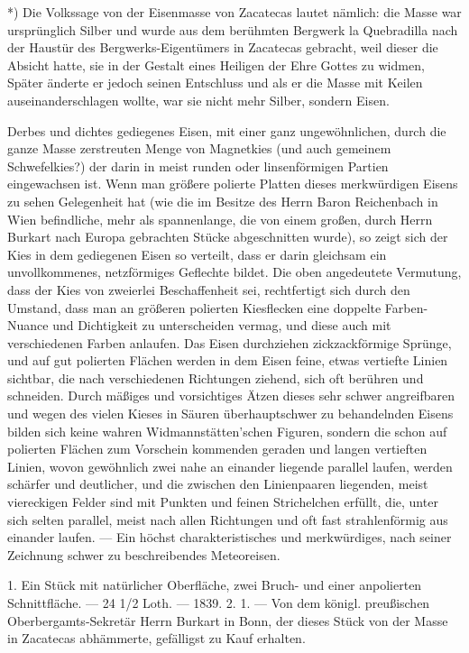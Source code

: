 \documentclass[a4paper, 11pt, oneside, polutonikogreek, german]{article}
\begin{document}
*) Die Volkssage von der Eisenmasse von Zacatecas lautet nämlich: die Masse war ursprünglich Silber und wurde aus dem berühmten Bergwerk la Quebradilla nach der Haustür des Bergwerks-Eigentümers in Zacatecas gebracht, weil dieser die Absicht hatte, sie in der Gestalt eines Heiligen der Ehre Gottes zu widmen, Später änderte er jedoch seinen Entschluss und als er die Masse mit Keilen auseinanderschlagen wollte, war sie nicht mehr Silber, sondern Eisen.

Derbes und dichtes gediegenes Eisen, mit einer ganz ungewöhnlichen, durch die ganze Masse zerstreuten Menge von Magnetkies (und auch gemeinem Schwefelkies?) der darin in meist runden oder linsenförmigen Partien eingewachsen ist. Wenn man größere polierte Platten dieses merkwürdigen Eisens zu sehen Gelegenheit hat (wie die im Besitze des Herrn Baron Reichenbach in Wien befindliche, mehr als spannenlange, die von einem großen, durch Herrn Burkart nach Europa gebrachten Stücke abgeschnitten wurde), so zeigt sich der Kies in dem gediegenen Eisen so verteilt, dass er darin gleichsam ein unvollkommenes, netzförmiges Geflechte bildet. Die oben angedeutete Vermutung, dass der Kies von zweierlei Beschaffenheit sei, rechtfertigt sich durch den Umstand, dass man an größeren polierten Kiesflecken eine doppelte Farben-Nuance und Dichtigkeit zu unterscheiden vermag, und diese auch mit verschiedenen Farben anlaufen. Das Eisen durchziehen zickzackförmige Sprünge, und auf gut polierten Flächen werden in dem Eisen feine, etwas vertiefte Linien sichtbar, die nach verschiedenen Richtungen ziehend, sich oft berühren und schneiden. Durch mäßiges und vorsichtiges Ätzen dieses sehr schwer angreifbaren und wegen des vielen Kieses in Säuren überhauptschwer zu behandelnden Eisens bilden sich keine wahren Widmannstätten'schen Figuren, sondern die schon auf polierten Flächen zum Vorschein kommenden geraden und langen vertieften Linien, wovon gewöhnlich zwei nahe an einander liegende parallel laufen, werden schärfer und deutlicher, und die zwischen den Linienpaaren liegenden, meist viereckigen Felder sind mit Punkten und feinen Strichelchen erfüllt, die, unter sich selten parallel, meist nach allen Richtungen und oft fast strahlenförmig aus einander laufen. — Ein höchst charakteristisches und merkwürdiges, nach seiner Zeichnung schwer zu beschreibendes Meteoreisen.

1. Ein Stück mit natürlicher Oberfläche, zwei Bruch- und einer anpolierten Schnittfläche. — 24 1/2 Loth. — 1839. 2. 1. — Von dem königl. preußischen Oberbergamts-Sekretär Herrn Burkart in Bonn, der dieses Stück von der Masse in Zacatecas abhämmerte, gefälligst zu Kauf erhalten.
\end{document}
